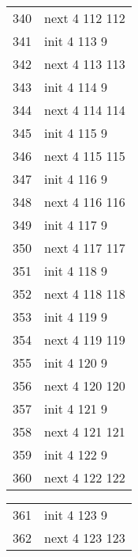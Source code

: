 \begin{center}
    \begin{tabular}[h!]{>{\ttfamily\color{UniRed}}r >{\ttfamily}l }
        340 & next \color{UniGrey} 4 \color{UniRed} 112 112 \\
        341 & init \color{UniGrey} 4 \color{UniRed} 113 9   \\
        342 & next \color{UniGrey} 4 \color{UniRed} 113 113 \\
        343 & init \color{UniGrey} 4 \color{UniRed} 114 9   \\
        344 & next \color{UniGrey} 4 \color{UniRed} 114 114 \\
        345 & init \color{UniGrey} 4 \color{UniRed} 115 9   \\
        346 & next \color{UniGrey} 4 \color{UniRed} 115 115 \\
        347 & init \color{UniGrey} 4 \color{UniRed} 116 9   \\
        348 & next \color{UniGrey} 4 \color{UniRed} 116 116 \\
        349 & init \color{UniGrey} 4 \color{UniRed} 117 9   \\
        350 & next \color{UniGrey} 4 \color{UniRed} 117 117 \\
        351 & init \color{UniGrey} 4 \color{UniRed} 118 9   \\
        352 & next \color{UniGrey} 4 \color{UniRed} 118 118 \\
        353 & init \color{UniGrey} 4 \color{UniRed} 119 9   \\
        354 & next \color{UniGrey} 4 \color{UniRed} 119 119 \\
        355 & init \color{UniGrey} 4 \color{UniRed} 120 9   \\
        356 & next \color{UniGrey} 4 \color{UniRed} 120 120 \\
        357 & init \color{UniGrey} 4 \color{UniRed} 121 9   \\
        358 & next \color{UniGrey} 4 \color{UniRed} 121 121 \\
        359 & init \color{UniGrey} 4 \color{UniRed} 122 9   \\
        360 & next \color{UniGrey} 4 \color{UniRed} 122 122 \\
    \end{tabular}\quad
    \begin{tabular}[h!]{>{\ttfamily\color{UniRed}}r >{\ttfamily}l  }
        361 & init \color{UniGrey} 4 \color{UniRed} 123 9   \\
        362 & next \color{UniGrey} 4 \color{UniRed} 123 123 \\

\end{tabular}
\end{center}
